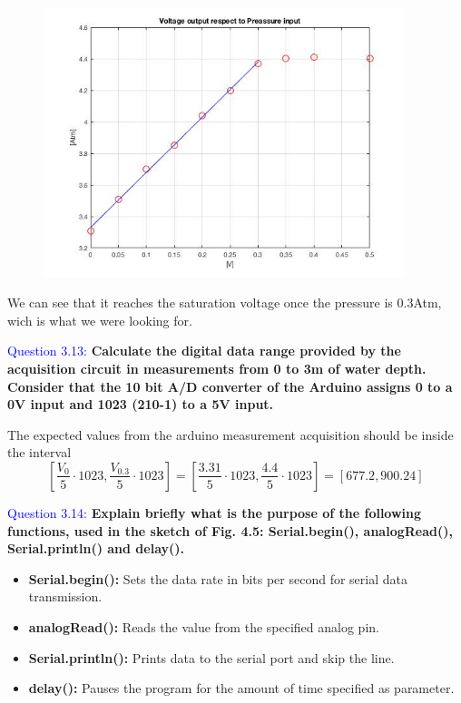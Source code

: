 \documentclass[12pt, a4papre]{article}
\begin{document}
	
	\begin{figure}[H]
		\begin{center}
		\includegraphics[width=105mm]{MatlabGraph1.jpg}
		\end{center}
	\end{figure}
	
	We can see that it reaches the saturation voltage once the pressure is 0.3Atm, wich is what we were looking for.
	
	
	

	\textcolor{blue}{Question 3.13:}  \textbf{Calculate the digital data range provided by the acquisition circuit in measurements from 0 to 3m of water depth. Consider that the 10 bit A/D converter of the Arduino assigns 0 to a 0V input and 1023 (210-1) to a 5V input.}
	
	The expected values from the arduino measurement acquisition should be inside the interval
	\[
		[\frac{V_0}{5}\cdot1023, \frac{V_{0.3}}{5}\cdot1023] = [\frac{3.31}{5}\cdot1023, \frac{4.4}{5}\cdot1023] = [677.2, 900.24]
	\]
	
	\textcolor{blue}{Question 3.14:} \textbf{Explain briefly what is the purpose of the following functions, used in the sketch of Fig. 4.5: Serial.begin(), analogRead(), Serial.println() and delay(). }
	\begin{itemize}
		\item \textbf{Serial.begin():} Sets the data rate in bits per second for serial data transmission.
		\item \textbf{analogRead():} Reads the value from the specified analog pin.
		\item \textbf{Serial.println():} Prints data to the serial port and skip the line.
		\item \textbf{delay():} Pauses the program for the amount of time specified as parameter.
	
	\end{itemize}
\end{document}
